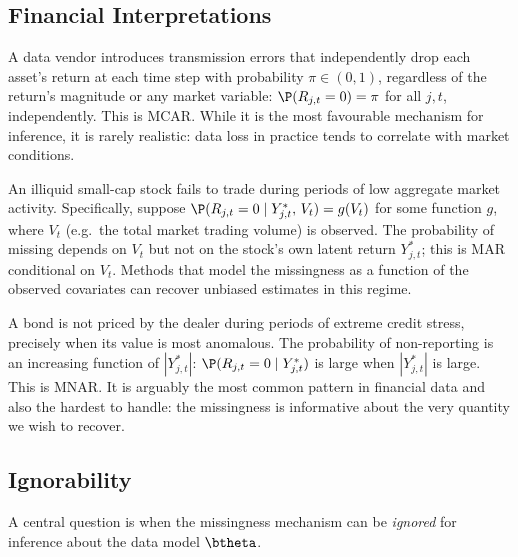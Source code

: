 \subsection{Financial Interpretations}
\label{subsec:financial_interpretations}

\begin{example}
\label{ex:mcar}
A data vendor introduces transmission errors that independently drop each
asset's return at each time step with probability $\pi\in(0,1)$, regardless
of the return's magnitude or any market variable:
$\P(R_{j,t}=0)=\pi$ for all $j,t$, independently.
This is MCAR.  While it is the most favourable mechanism for inference, it is
rarely realistic: data loss in practice tends to correlate with market
conditions.
\end{example}

\begin{example}
\label{ex:mar}
An illiquid small-cap stock fails to trade during periods of low
aggregate market activity.  Specifically, suppose
$\P(R_{j,t}=0 \mid Y_{j,t}^*,\,V_t) = g(V_t)$
for some function $g$, where $V_t$ (e.g.\ the total market trading volume)
is observed.  The probability of missing depends on $V_t$ but not on the
stock's own latent return $Y_{j,t}^*$; this is MAR conditional on $V_t$.
Methods that model the missingness as a function of the observed covariates
can recover unbiased estimates in this regime.
\end{example}

\begin{example}
\label{ex:mnar}
A bond is not priced by the dealer during periods of extreme credit stress,
precisely when its value is most anomalous.  The probability of non-reporting
is an increasing function of $|Y_{j,t}^*|$:
$\P(R_{j,t}=0\mid Y_{j,t}^*)$ is large when $|Y_{j,t}^*|$ is large.
This is MNAR.  It is arguably the most common pattern in financial data and
also the hardest to handle: the missingness is informative about the very
quantity we wish to recover.
\end{example}

\subsection{Ignorability}
\label{subsec:ignorability}

A central question is when the missingness mechanism can be \emph{ignored}
for inference about the data model $\btheta$.

